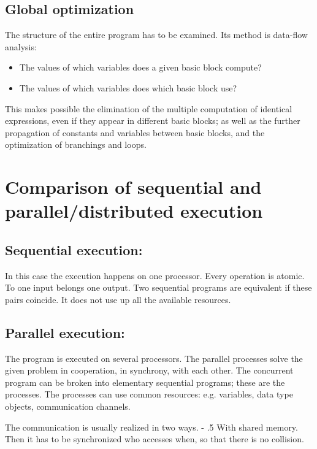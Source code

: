 \documentclass[margin=0px]{article}
\makeatletter
\renewcommand\paragraph{%
    \@startsection{paragraph}{4}{0mm}%
    {-\baselineskip}%
    {.5\baselineskip}%
    {\normalfont\normalsize\bfseries}}
\makeatother
\begin{document}
\subsection{Global optimization}
The structure of the entire program has to be examined. Its method is data-flow analysis:
\begin{itemize}
    \item
          The values of which variables does a given basic block compute?
    \item
          The values of which variables does which basic block use?
\end{itemize}


This makes possible the elimination of the multiple computation of identical expressions, even if they appear in different basic blocks; as well as the further propagation of constants and variables between basic blocks, and the optimization of branchings and loops.

\section{Comparison of sequential and parallel/distributed execution}

\subsection{Sequential execution:}

In this case the execution happens on one processor. Every operation is atomic. To one input belongs one output. Two sequential programs are equivalent if these pairs coincide. It does not use up all the available resources.


\subsection{Parallel execution:}

The program is executed on several processors. The parallel processes solve the given problem in cooperation, in synchrony, with each other. The concurrent program can be broken into elementary sequential programs; these are the processes. The processes can use common resources: e.g. variables, data type objects, communication channels.

The communication is usually realized in two ways.
\paragraph{With shared memory.} Then it has to be synchronized who accesses when, so that there is no collision.
\end{document}
